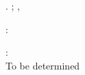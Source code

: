 
\thispagestyle{empty}

\hfill

\vfill

\noindent\myName. \textit{\myTitle} \mySubtitle; \myDegree, \myTime

\bigskip
%
\noindent{}: \\
\myProf
%
\medskip

\noindent{}: \\
To be determined \\

%
\medskip

\noindent\myLocation


